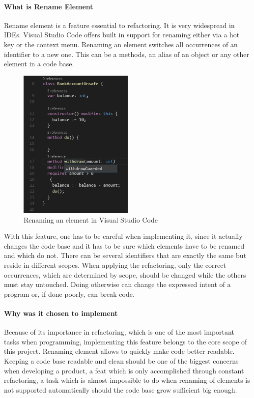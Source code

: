 \paragraph{What is Rename Element}
Rename element is a feature essential to refactoring. It is very widespread in IDEs. Visual Studio Code offers built in support for renaming either via a hot key or the context menu. Renaming an element switches all occurrences of an identifier to a new one. This can be a methods, an alias of an object or any other element in a code base. \newline
\begin{figure}[H]
	\centering
	\includegraphics[width=0.5\textwidth]{img/rename}
	\caption{Renaming an element in Visual Studio Code}
	\label{fig:agrename}
\end{figure}
With this feature, one has to be careful when implementing it, since it actually changes the code base and it has to be sure which elements have to be renamed and which do not. There can be several identifiers that are exactly the same but reside in different scopes. When applying the refactoring, only the correct occurrences, which are determined by scope, should be changed while the others must stay untouched. Doing otherwise can change the expressed intent of a program or, if done poorly, can break code.
\paragraph{Why was it chosen to implement}
Because of its importance in refactoring, which is one of the most important tasks when programming, implementing this feature belongs to the core scope of this project. Renaming element allows to quickly make code better readable.\newline
Keeping a code base readable and clean should be one of the biggest concerns when developing a product, a feat which is only accomplished through constant refactoring, a task which is almost impossible to do when renaming of elements is not supported automatically should the code base grow sufficient big enough.
